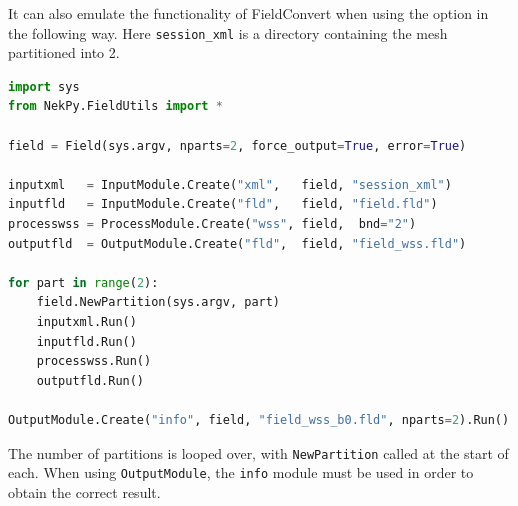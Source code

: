It can also emulate the functionality of FieldConvert when using the
 option in the following way. Here \verb+session_xml+ is a
directory containing the mesh partitioned into 2.

\begin{lstlisting}[style=C++Style, language=Python]
import sys
from NekPy.FieldUtils import *

field = Field(sys.argv, nparts=2, force_output=True, error=True)

inputxml   = InputModule.Create("xml",   field, "session_xml")
inputfld   = InputModule.Create("fld",   field, "field.fld")
processwss = ProcessModule.Create("wss", field,  bnd="2")
outputfld  = OutputModule.Create("fld",  field, "field_wss.fld")

for part in range(2):
	field.NewPartition(sys.argv, part)
	inputxml.Run()
	inputfld.Run()
	processwss.Run()
	outputfld.Run()

OutputModule.Create("info", field, "field_wss_b0.fld", nparts=2).Run()
\end{lstlisting}

The number of partitions is looped over, with \verb+NewPartition+ called at
the start of each. When using \verb+OutputModule+, the \verb+info+ module
must be used in order to obtain the correct result.

